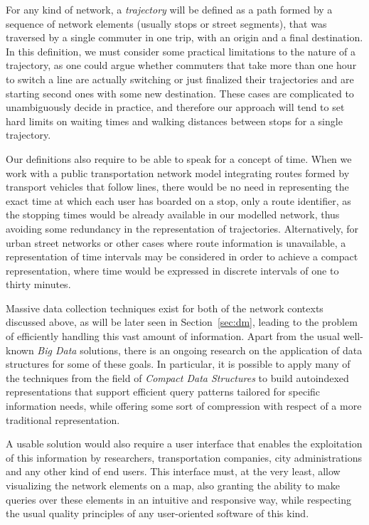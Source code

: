 \documentclass[a4paper,10pt,twoside]{book}
\begin{document}
	For any kind of network, a \textit{trajectory} will be defined as a path formed by a sequence of network elements (usually stops or street segments), that was traversed by a single commuter in one trip, with an origin and a final destination. In this definition, we must consider some practical limitations to the nature of a trajectory, as one could argue whether commuters that take more than one hour to switch a line are actually switching or just finalized their trajectories and are starting second ones with some new destination. These cases are complicated to unambiguously decide in practice, and therefore our approach will tend to set hard limits on waiting times and walking distances between stops for a single trajectory.
	
	Our definitions also require to be able to speak for a concept of time. When we work with a public transportation network model integrating routes formed by transport vehicles that follow lines, there would be no need in representing the exact time at which each user has boarded on a stop, only a route identifier, as the stopping times would be already available in our modelled network, thus avoiding some redundancy in the representation of trajectories.
	Alternatively, for urban street networks or other cases where route information is unavailable, a representation of time intervals may be considered in order to achieve a compact representation, where time would be expressed in discrete intervals of one to thirty minutes.
	
	Massive data collection techniques exist for both of the network contexts discussed above, as will be later seen in Section~\ref{sec:dm}, leading to the problem of efficiently handling this vast amount of information. Apart from the usual well-known \textit{Big Data} solutions, there is an ongoing research on the application of data structures for some of these goals. In particular, it is possible to apply many of the techniques from the field of \textit{Compact Data Structures} to build autoindexed representations that support efficient query patterns tailored for specific information needs, while offering some sort of compression with respect of a more traditional representation.
	
	A usable solution would also require a user interface that enables the exploitation of this information by researchers, transportation companies, city administrations and any other kind of end users. This interface must, at the very least, allow visualizing the network elements on a map, also granting the ability to make queries over these elements in an intuitive and responsive way, while respecting the usual quality principles of any user-oriented software of this kind.
	
\end{document}

